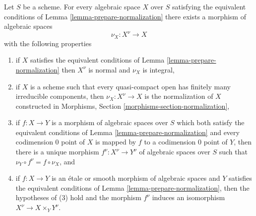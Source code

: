 \begin{lemma}
\label{lemma-normalization}
Let $S$ be a scheme. For every algebraic space $X$ over $S$ satisfying
the equivalent conditions of Lemma \ref{lemma-prepare-normalization}
there exists a morphism of algebraic spaces
$$
\nu_X : X^\nu \longrightarrow X
$$
with the following properties
\begin{enumerate}
\item if $X$ satisfies the equivalent conditions of
Lemma \ref{lemma-prepare-normalization} then
$X^\nu$ is normal and $\nu_X$ is integral,
\item if $X$ is a scheme such that every quasi-compact open has finitely
many irreducible components, then $\nu_X : X^\nu \to X$ is the
normalization of $X$ constructed in
Morphisms, Section \ref{morphisms-section-normalization},
\item if $f : X \to Y$ is a morphism of algebraic spaces over $S$
which both satisfy the equivalent conditions of
Lemma \ref{lemma-prepare-normalization} and every codimension $0$
point of $X$ is mapped by $f$ to a codimension $0$ point of $Y$, then
there is a unique morphism $f^\nu : X^\nu \to Y^\nu$ of algebraic
spaces over $S$ such that $\nu_Y \circ f^\nu = f \circ \nu_X$, and
\item if $f : X \to Y$ is an \'etale or smooth morphism of algebraic
spaces and $Y$ satisfies the equivalent conditions of
Lemma \ref{lemma-prepare-normalization}, then the hypotheses of (3)
hold and the morphism $f^\nu$ induces an isomorphism
$X^\nu  \to X \times_Y Y^\nu$.
\end{enumerate}
\end{lemma}

